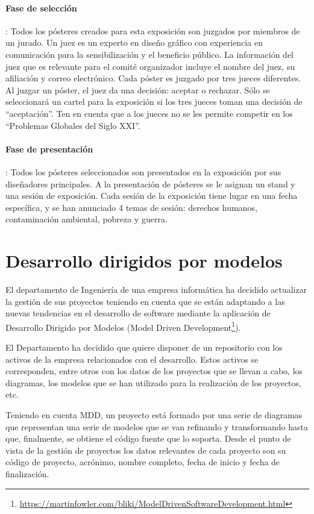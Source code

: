 \documentclass[a4paper]{article}
\begin{document}
\paragraph{Fase de selección}: Todos los pósteres creados para esta exposición son juzgados por miembros de un jurado.  Un juez es un experto en diseño gráfico con experiencia en comunicación para la sensibilización y el beneficio público.  La información del juez que es relevante para el comité organizador incluye el nombre del juez, su afiliación y correo electrónico.  Cada póster es juzgado por tres jueces diferentes.  Al juzgar un póster, el juez da una decisión: aceptar o rechazar.  Sólo se seleccionará un cartel para la exposición si los tres jueces toman una decisión de ``aceptación''.  Ten en cuenta que a los jueces no se les permite competir en los ``Problemas Globales del Siglo XXI''.
\paragraph{Fase de presentación}: Todos los pósteres seleccionados son presentados en la exposición por sus diseñadores principales.  A la presentación de pósteres se le asignan un stand y una sesión de exposición.  Cada sesión de la exposición tiene lugar en una fecha específica, y se han anunciado 4 temas de sesión: derechos humanos, contaminación ambiental, pobreza y guerra.

\section{Desarrollo dirigidos por modelos}
El departamento de Ingeniería de una empresa informática ha decidido actualizar la gestión de sus proyectos teniendo en cuenta que se están adaptando a las nuevas tendencias en el desarrollo de software mediante la aplicación de Desarrollo Dirigido por Modelos (Model Driven Development\footnote{\url{https://martinfowler.com/bliki/ModelDrivenSoftwareDevelopment.html}}).

El Departamento ha decidido que quiere disponer de un repositorio con los activos de la empresa relacionados con el desarrollo. Estos activos se corresponden, entre otros con los datos de los proyectos que se llevan a cabo, los diagramas, los modelos que se han utilizado para la realización de los proyectos, etc.

Teniendo en cuenta MDD, un proyecto está formado por una serie de diagramas que representan una serie de modelos que se van refinando y transformando hasta que, finalmente, se obtiene el código fuente que lo soporta. Desde el punto de vista de la gestión de proyectos los datos relevantes de cada proyecto son su código de proyecto, acrónimo, nombre completo, fecha de inicio y fecha de finalización.
\end{document}
